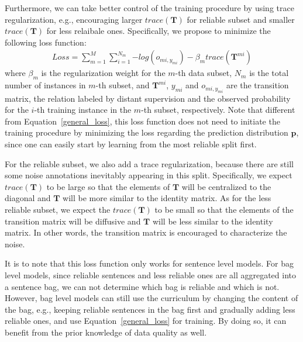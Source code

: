 Furthermore, we can take better control of the training procedure by using trace regularization, e.g., encouraging larger $trace (\mathbf{T})$ for reliable subset and smaller $trace (\mathbf{T})$ for less relaibale ones.
Specifically, we propose to minimize the following  loss function:
%
\begin{equation}
\begin{aligned}
Loss=\sum_{m=1}^M{\sum_{i=1}^{N_m}{-log(o_{mi,y_{mi}})}} - \beta_m trace(\mathbf{T}^{mi})
\end{aligned}
\end{equation}
where $\beta_m$ is the regularization weight for the $m$-th data subset, $N_m$ is the total number of instances in $m$-th subset, and  $\mathbf{T}^{mi}$, $y_{mi}$ and $o_{mi,y_{mi}}$ are the transition matrix, the relation labeled by distant supervision and the observed probability for the $i$-th training instance in the $m$-th subset, respectively. Note that different from Equation~\ref{general_loss}, this loss function does not need to initiate the training procedure by
minimizing the loss regarding the prediction distribution $\mathbf{p}$, since one can easily start by learning from the most reliable split first. 


For the reliable subset, we also add a trace regularization, because there are still some noise annotations inevitably appearing in this split. 
Specifically, we expect $trace(\mathbf{T})$ to be large so that the elements of $\mathbf{T}$ will be centralized to the diagonal and $\mathbf{T}$ will be more similar to the identity matrix. As for the  less reliable subset, we expect the $trace (\mathbf{T})$ to be small  so that the elements of the transition matrix will be diffusive and $\mathbf{T}$  will be less similar to the identity matrix. In other words, the transition matrix is encouraged to characterize the noise.

It is to note that this loss function only works for sentence level models. For bag level models, since reliable sentences and less reliable ones are all aggregated into a sentence bag,  we can not determine which bag is reliable and which is not. However, bag level models can still use the curriculum by changing the content of the bag, e.g., keeping reliable sentences in the bag first and gradually adding less reliable ones, and use Equation~\ref{general_loss} for training. By doing so, it can benefit from the prior knowledge of data quality as well.



